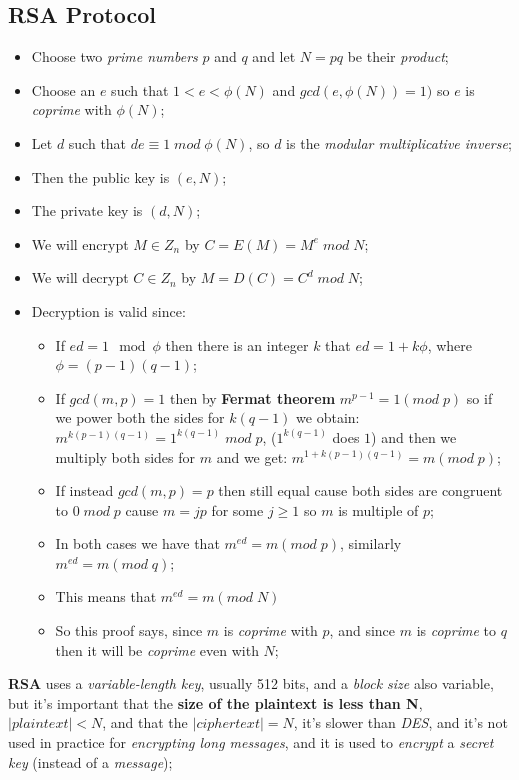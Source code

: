 \documentclass{article}
\begin{document}
\subsection{RSA Protocol}
\begin{itemize}
\item Choose two \emph{prime numbers} $p$ and $q$ and let $N=pq$ be their \emph{product};
\item Choose an $e$ such that $1<e<\phi(N)$ and $gcd(e, \phi(N))=1)$ so $e$ is \emph{coprime} with $\phi(N)$;
\item Let $d$ such that $de \equiv 1\; mod\; \phi(N)$, so $d$ is the \emph{modular multiplicative inverse}; 
\item Then the public key is $(e,N)$;
\item The private key is $(d,N)$;
\item We will encrypt $M \in Z_n$ by $C = E(M) = M^e\; mod\; N$;
\item We will decrypt $C \in Z_n$ by $M = D(C) = C^d\; mod\; N$;
\item Decryption is valid since:
\begin{itemize}
\item If $ed= 1 \mod \phi$ then there is an integer $k$ that $ed= 1+k \phi$, where $\phi = (p-1)(q-1)$;
\item If $gcd(m,p) = 1$ then by \textbf{Fermat theorem} $m^{p-1} = 1 (mod\; p)$ so if we power both the sides for $k(q-1)$ we obtain: $m^{k(p-1)(q-1)} = 1^{k(q-1)}\; mod\; p$, ($1^{k(q-1)}$ does $1$) and then we multiply both sides for $m$ and we get: $m^{1+k(p-1)(q-1)} = m(mod\; p)$;
\item If instead $gcd(m,p) = p$ then still equal cause both sides are congruent to $0\; mod\; p$ cause $m = jp$ for some $j \geq 1$ so $m$ is multiple of $p$;
\item In both cases we have that $m^{ed} = m (mod\; p)$, similarly $m^{ed} = m (mod\; q)$;
\item This means that  $m^{ed} = m (mod\; N)$
\item So this proof says, since $m$ is \emph{coprime} with $p$, and since $m$ is \emph{coprime} to $q$ then it will be \emph{coprime} even with $N$; 
\end{itemize}
\end{itemize}
\textbf{RSA} uses a \emph{variable-length key}, usually 512 bits, and a \emph{block size} also variable, but it's important that the \textbf{size of the plaintext is less than N}, $|plaintext|<N$, and that the $|ciphertext|=N$, it's slower than \emph{DES}, and it's not used in practice for \emph{encrypting long messages}, and it is used to \emph{encrypt} a \emph{secret key} (instead of a \emph{message});\\\\
\end{document}

